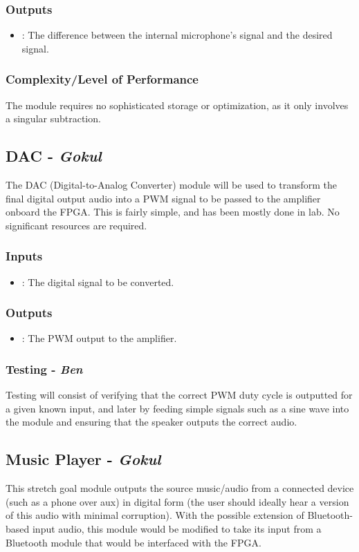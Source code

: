 \documentclass{fpgairpods}
\begin{document}
\begin{multicols*}{2}
\subsubsection{Outputs}
\begin{itemize}
    \item {}: The difference between the internal microphone's signal and the desired signal.
\end{itemize}
\subsubsection{Complexity/Level of Performance}
The module requires no sophisticated storage or optimization, as it only involves a singular subtraction. 


\subsection{DAC - \textit{Gokul}}
The DAC (Digital-to-Analog Converter) module will be used to transform the final digital output audio into a PWM signal to be passed to the amplifier onboard the FPGA. This is fairly simple, and has been mostly done in lab. No significant resources are required.
\subsubsection{Inputs}
\begin{itemize}
    \item {}: The digital signal to be converted.
\end{itemize}
\subsubsection{Outputs}
\begin{itemize}
    \item {}: The PWM output to the amplifier.
\end{itemize}
\subsubsection{Testing - \textit{Ben}}
Testing will consist of verifying that the correct PWM duty cycle is outputted for a given known input, and later by feeding simple signals such as a sine wave into the module and ensuring that the speaker outputs the correct audio.

\subsection{Music Player - \textit{Gokul}}
This stretch goal module outputs the source music/audio from a connected device (such as a phone over aux) in digital form (the user should ideally hear a version of this audio with minimal corruption). With the possible extension of Bluetooth-based input audio, this module would be modified to take its input from a Bluetooth module that would be interfaced with the FPGA.

\end{multicols*}
\end{document}
